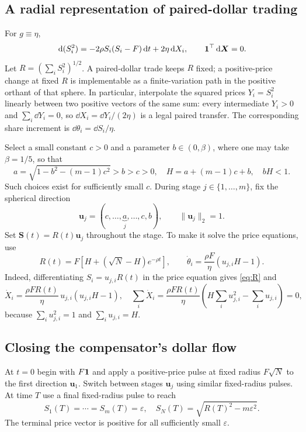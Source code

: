 \documentclass[review,hidelinks,onefignum,onetabnum]{siamonline250211}
\begin{document}
\subsection{A radial representation of paired-dollar trading}
For $g\equiv\eta$,
\begin{equation}\label{eq:radius-appendix}
\,\mathrm{d}(S_i^2)= -2\rho S_i(S_i-F)\,\mathrm{d} t+2\eta\,\mathrm{d} X_i,
\qquad \mathbf{1}^\top\,\mathrm{d}\bm X=0.
\end{equation}
Let $R=(\sum_iS_i^2)^{1/2}$. A paired-dollar trade keeps $R$ fixed; a positive-price change at fixed $R$ is implementable as a finite-variation path in the positive orthant of that sphere. In particular, interpolate the squared prices $Y_i=S_i^2$ linearly between two positive vectors of the same sum: every intermediate $Y_i>0$ and $\sum_i\dd Y_i=0$, so $\dd X_i=\dd Y_i/(2\eta)$ is a legal paired transfer. The corresponding share increment is $\dd\theta_i=\dd S_i/\eta$.

Select a small constant $c>0$ and a parameter $b\in(0,\beta)$, where one may take $\beta=1/5$, so that
\begin{equation}\label{eq:abcs}
a=\sqrt{1-b^2-(m-1)c^2}>b>c>0,
\quad
H=a+(m-1)c+b,
\quad bH<1.
\end{equation}
Such choices exist for sufficiently small $c$. During stage $j\in\{1,\dots,m\}$, fix the spherical direction
\begin{equation}\label{eq:uj}
\bm u_j=(c,\ldots,\underbrace{a}_{j},\ldots,c,b),
\qquad \|\bm u_j\|_2=1.
\end{equation}
Set $\bm S(t)=R(t)\bm u_j$ throughout the stage. To make it solve the price equations, use
\begin{equation}\label{eq:R}
R(t)=F\left[H+(\sqrt N-H)e^{-\rho t}\right],
\qquad
\dot\theta_i=\frac{\rho F}{\eta}\left(u_{j,i}H-1\right).
\end{equation}
Indeed, differentiating $S_i=u_{j,i}R(t)$ in the price equation gives \eqref{eq:R} and
\begin{equation}\label{eq:dXdt}
\dot X_i=\frac{\rho FR(t)}\eta\,u_{j,i}(u_{j,i}H-1),
\quad \sum_i\dot X_i=\frac{\rho FR(t)}\eta\left(H\sum_i u_{j,i}^2-\sum_i u_{j,i}\right)=0,
\end{equation}
because $\sum_i u_{j,i}^2=1$ and $\sum_i u_{j,i}=H$.

\subsection{Closing the compensator's dollar flow}
At $t=0$ begin with $F\mathbf{1}$ and apply a positive-price pulse at fixed radius $F\sqrt N$ to the first direction $\bm u_1$. Switch between stages $\bm u_j$ using similar fixed-radius pulses. At time $T$ use a final fixed-radius pulse to reach
\begin{equation}\label{eq:endpoint-severe}
S_1(T)=\cdots=S_m(T)=\varepsilon,
\quad S_N(T)=\sqrt{R(T)^2-m\varepsilon^2}.
\end{equation}
The terminal price vector is positive for all sufficiently small $\varepsilon$.
\end{document}
